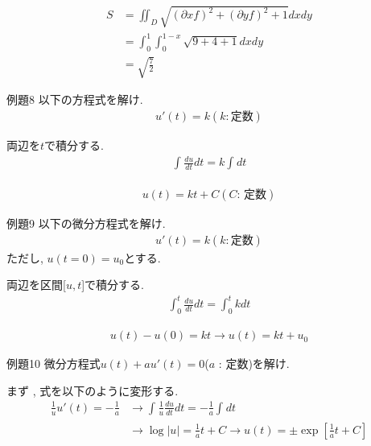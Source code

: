 \documentclass[a4paper,12pt]{jlreq}
\begin{document}
\par
\begin{align*}
    S &= \iint_{D}^{} \sqrt{(\partial xf)^2 +(\partial yf)^2 + 1 } dxdy\\
      &= \int_{0}^{1} \int_{0}^{1-x} \sqrt{9+4+1}dxdy\\
      &= \sqrt{\frac{7}{2}}
\end{align*}



\begin{itembox}[l]{例題8}
以下の方程式を解け.
\begin{align*}
    u'(t) = k 　(k :\text{定数})
\end{align*}

\end{itembox}

\par
両辺を$t$で積分する.
\begin{align*}
    \int_{}^{} \frac{du}{dt}dt = k \int_{}^{} dt
\end{align*}

\begin{align*}
    u(t) = kt + C (C \text{: 定数})
\end{align*}



\begin{itembox}[l]{例題9}
以下の微分方程式を解け.
\begin{align*}
    u'(t) = k 　(k :\text{定数})
\end{align*}
ただし, $u(t=0) = u_0$とする.

\end{itembox}

\par
両辺を区間[$u,t$]で積分する.
\begin{align*}
    \int_{0}^{t} \frac{du}{dt} dt = \int_{0}^{t} k dt
\end{align*}

\begin{align*}
    u(t) - u(0) = kt \rightarrow u(t) = kt + u_0
\end{align*}



\begin{itembox}[l]{例題10}
微分方程式$u(t) + au'(t) = 0$($a$ : 定数)を解け.

\end{itembox}

\par
まず , 式を以下のように変形する. 
\begin{align*}
    \frac{1}{u}u'(t) = -\frac{1}{a} &\rightarrow \int_{}^{} \frac{1}{u} \frac{du}{dt} dt = -\frac{1}{a} \int_{}^{} dt\\
                                    &\rightarrow \log\left|u\right| = \frac{1}{a} t + C \rightarrow u(t) = \pm \exp[\frac{1}{a} t + C]
\end{align*}
\end{document}
